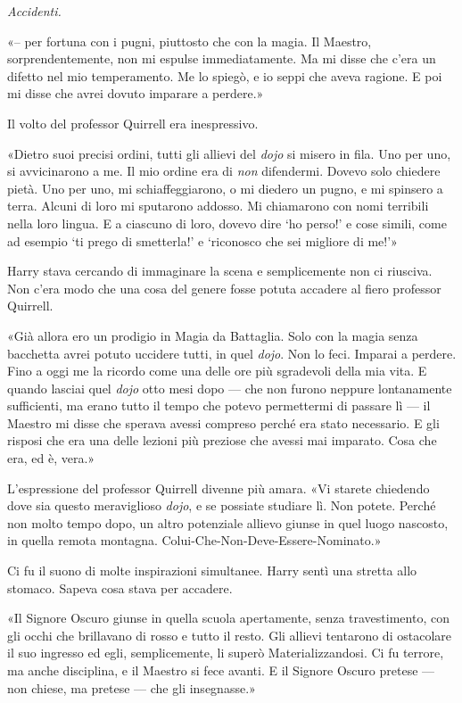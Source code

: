 \textit{Accidenti.}

«– per fortuna con i pugni, piuttosto che con la magia. Il Maestro, sorprendentemente, non mi espulse immediatamente. Ma mi disse che c’era un difetto nel mio temperamento. Me lo spiegò, e io seppi che aveva ragione. E poi mi disse che avrei dovuto imparare a perdere.»

Il volto del professor Quirrell era inespressivo.

«Dietro suoi precisi ordini, tutti gli allievi del \textit{dojo} si misero in fila. Uno per uno, si avvicinarono a me. Il mio ordine era di \textit{non} difendermi. Dovevo solo chiedere pietà. Uno per uno, mi schiaffeggiarono, o mi diedero un pugno, e mi spinsero a terra. Alcuni di loro mi sputarono addosso. Mi chiamarono con nomi terribili nella loro lingua. E a ciascuno di loro, dovevo dire ‘ho perso!’ e cose simili, come ad esempio ‘ti prego di smetterla!’ e ‘riconosco che sei migliore di me!’»

Harry stava cercando di immaginare la scena e semplicemente non ci riusciva. Non c’era modo che una cosa del genere fosse potuta accadere al fiero professor Quirrell.

«Già allora ero un prodigio in Magia da Battaglia. Solo con la magia senza bacchetta avrei potuto uccidere tutti, in quel \textit{dojo}. Non lo feci. Imparai a perdere. Fino a oggi me la ricordo come una delle ore più sgradevoli della mia vita. E quando lasciai quel \textit{dojo} otto mesi dopo — che non furono neppure lontanamente sufficienti, ma erano tutto il tempo che potevo permettermi di passare lì — il Maestro mi disse che sperava avessi compreso perché era stato necessario. E gli risposi che era una delle lezioni più preziose che avessi mai imparato. Cosa che era, ed è, vera.»

L’espressione del professor Quirrell divenne più amara. «Vi starete chiedendo dove sia questo meraviglioso \textit{dojo}, e se possiate studiare lì. Non potete. Perché non molto tempo dopo, un altro potenziale allievo giunse in quel luogo nascosto, in quella remota montagna. Colui-Che-Non-Deve-Essere-Nominato.»

Ci fu il suono di molte inspirazioni simultanee. Harry sentì una stretta allo stomaco. Sapeva cosa stava per accadere.

«Il Signore Oscuro giunse in quella scuola apertamente, senza travestimento, con gli occhi che brillavano di rosso e tutto il resto. Gli allievi tentarono di ostacolare il suo ingresso ed egli, semplicemente, li superò Materializzandosi. Ci fu terrore, ma anche disciplina, e il Maestro si fece avanti. E il Signore Oscuro pretese — non chiese, ma pretese — che gli insegnasse.»

